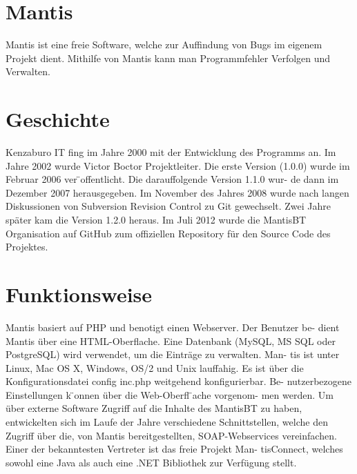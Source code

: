 \section{Mantis}
Mantis ist eine freie Software, welche zur Auffindung von Bugs im eigenem
Projekt dient. Mithilfe von Mantis kann man Programmfehler Verfolgen und
Verwalten.
\section{Geschichte}
Kenzaburo IT fing im Jahre 2000 mit der Entwicklung des Programms an.
Im Jahre 2002 wurde Victor Boctor Projektleiter. Die erste Version (1.0.0)
wurde im Februar 2006 ver ̈offentlicht. Die darauffolgende Version 1.1.0 wur-
de dann im Dezember 2007 herausgegeben. Im November des Jahres 2008
wurde nach langen Diskussionen von Subversion Revision Control zu Git
gewechselt. Zwei Jahre später kam die Version 1.2.0 heraus. Im Juli 2012
wurde die MantisBT Organisation auf GitHub zum offiziellen Repository
für den Source Code des Projektes.
\section{Funktionsweise}
Mantis basiert auf PHP und benotigt einen Webserver. Der Benutzer be-
dient Mantis über eine HTML-Oberflache. Eine Datenbank (MySQL, MS
SQL oder PostgreSQL) wird verwendet, um die Einträge zu verwalten. Man-
tis ist unter Linux, Mac OS X, Windows, OS/2 und Unix lauffahig. Es ist
über die Konfigurationsdatei config inc.php weitgehend konfigurierbar. Be-
nutzerbezogene Einstellungen k ̈onnen über die Web-Oberfl ̈ache vorgenom-
men werden. Um über externe Software Zugriff auf die Inhalte des MantisBT
zu haben, entwickelten sich im Laufe der Jahre verschiedene Schnittstellen,
welche den Zugriff über die, von Mantis bereitgestellten, SOAP-Webservices
vereinfachen. Einer der bekanntesten Vertreter ist das freie Projekt Man-
tisConnect, welches sowohl eine Java als auch eine .NET Bibliothek zur
Verfügung stellt.

